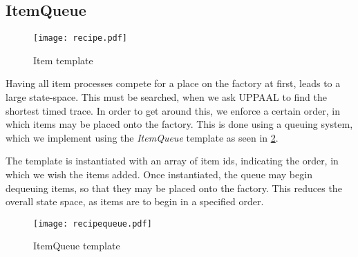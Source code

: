\subsection{ItemQueue}\label{subs:recipequeue}

\begin{figure}[h]
\centering
\texttt{[image: recipe.pdf]}
\caption{Item template}
\label{fig:recipe}
\end{figure}

Having all item processes compete for a place on the factory at first, leads to a large state-space. This must be searched, when we ask UPPAAL to find the shortest timed trace. In order to get around this, we enforce a certain order, in which items may be placed onto the factory. This is done using a queuing system, which we implement using the \emph{ItemQueue} template as seen in \cref{fig:recipequeue}.

The template is instantiated with an array of item ids, indicating the order, in which we wish the items added. Once instantiated, the queue may begin dequeuing items, so that they may be placed onto the factory. This reduces the overall state space, as items are to begin in a specified order. 

\begin{figure}[h]
\centering
\texttt{[image: recipequeue.pdf]}
\caption{ItemQueue template}
\label{fig:recipequeue}
\end{figure}